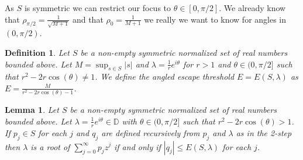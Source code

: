\documentclass[11pt]{amsart}
\newtheorem{lemma}[theorem]{Lemma}
\newtheorem{definition}[theorem]{Definition}
\numberwithin{theorem}{section} %
\numberwithin{corollary}{section}
\numberwithin{lemma}{section}
\numberwithin{proposition}{section}
\numberwithin{definition}{section}
\begin{document}
As $S$ is symmetric we can restrict our focus to $\theta \in [0, \pi/2]$. We already know that $\rho_{\pi/2} = \frac{1}{\sqrt{M+1}}$ and that $\rho_0 = \frac{1}{M+1}$ we really we want to know for angles in $(0, \pi/2)$.

\begin{definition}
Let $S$ be a non-empty symmetric normalized set of real numbers bounded above. Let $M = \sup_{s \in S} |s|$ and $\lambda = \frac{1}{r}e^{i\theta}$ for $r > 1$ and $\theta \in (0, \pi/2]$ such that $r^2-2r\cos(\theta) \neq 1$. We define the angled escape threshold $E = E(S, \lambda)$ as $E = \frac{M}{r^2-2r\cos(\theta)-1}$.
\end{definition}

\begin{lemma}
Let $S$ be a non-empty symmetric normalized set of real numbers bounded above. Let $\lambda = \frac{1}{r}e^{i\theta} \in \mathbb{D}$ with $\theta \in (0, \pi/2]$ such that $r^2-2r\cos(\theta) > 1$. If $p_j \in S$ for each $j$ and $q_j$ are defined recursively from $p_j$ and $\lambda$ as in the 2-step then $\lambda$ is a root of $\sum_{j=0}^\infty p_jz^j$ if and only if $|q_j| \leqslant E(S, \lambda)$ for each $j$.
\end{lemma}
\end{document}
